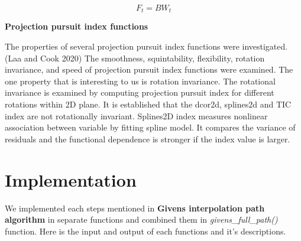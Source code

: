 \[F_t = B  W_t\]

\textbf{Projection pursuit index functions}

The properties of several projection pursuit index functions were investigated.(Laa and Cook 2020) The smoothness, squintability, flexibility, rotation invariance, and speed of projection pursuit index functions were examined. The one property that is interesting to us is rotation invariance. The rotational invariance is examined by computing projection pursuit index for different rotations within 2D plane. It is established that the dcor2d, splines2d and TIC index are not rotationally invariant. Splines2D index measures nonlinear association between variable by fitting spline model. It compares the variance of residuals and the functional dependence is stronger if the index value is larger.

\hypertarget{implementation}{%
\section{Implementation}\label{implementation}}

We implemented each steps mentioned in \textbf{Givens interpolation path algorithm} in separate functions and combined them in \emph{givens\_full\_path()} function. Here is the input and output of each functions and it's descriptions.

